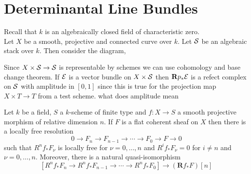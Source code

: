 \documentclass[12pt]{article}
\begin{document}
\section{Determinantal Line Bundles}

\newcommand{\R}{\mathbf{R}}
\newcommand{\univ}{\mathrm{univ}}
\newcommand{\cN}{\mathcal{N}}
\newcommand{\detstar}{\det\nolimits^{*}}

Recall that $k$ is an algebraically closed field of characteristic zero.
\bigskip\\
Let $X$ be a smooth, projective and connected curve over $k$. Let $\S$ be an algebraic stack over $k$. Then consider the diagram,
\begin{center}
\end{center}
Since $X \times \S \to \S$ is representable by schemes we can use cohomology and base change theorem. If $\E$ is a vector bundle on $X \times \S$ then $\R p_* \E$ is a refect complex on $\S$ with amplitude in $[0,1]$ since this is true for the projection map $X \times T \to T$ from a test scheme. {\color{red} what does amplitude mean}

\begin{prop}
Let $k$ be a field, $S$ a $k$-scheme of finite type and $f : X \to S$ a smooth projective morphism of relative dimension $n$. If $F$ is a flat coherent sheaf on $X$ then there is a locally free resolution
\[ 0 \to F_n \to F_{n-1} \to \cdots \to F_0 \to F \to 0 \]
such that $R^n f_* F_\nu$ is locally free for $\nu = 0, \dots, n$ and $R^i f_* F_\nu = 0$ for $i \neq n$ and $\nu = 0, \dots, n$. Moreover, there is a natural quasi-isomorphism
\[ [R^n f_* F_n \to R^n f_* F_{n-1} \to \cdots \to R^n f_* F_0] \to (\R f_* F)[n] \]
\end{prop}
\end{document}
